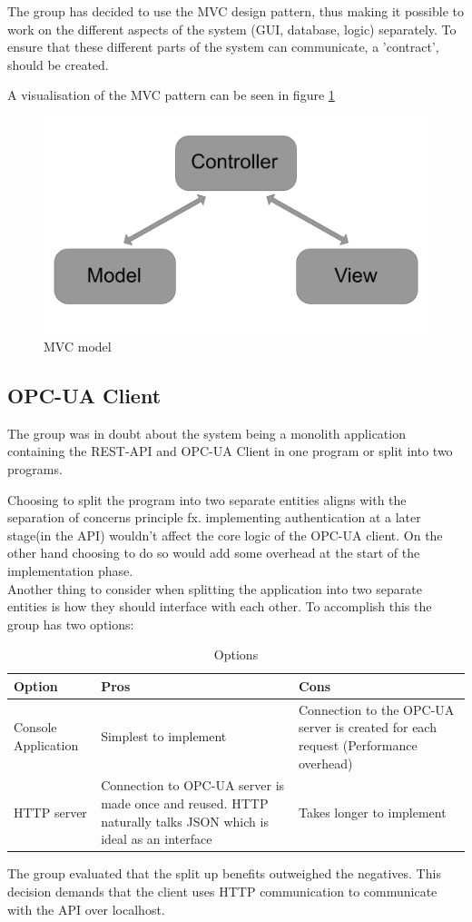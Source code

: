 The group has decided to use the MVC design pattern, thus making it possible to
work on the different aspects of the system (GUI, database, logic) separately.
To ensure that these different parts of the system can communicate, a
'contract', should be created.

A visualisation of the MVC pattern can be seen in figure \ref{figure:MVC_model}

\begin{figure}[ht]
    \centering
    \includegraphics[scale=0.15]{images/MVC_model.png}
    \caption{MVC model}
    \label{figure:MVC_model}
\end{figure}

\subsection{OPC-UA Client}
The group was in doubt about the system being a monolith application containing 
the REST-API and OPC-UA Client in one program or split into two programs.

Choosing to split the program into two separate entities aligns with the 
separation of concerns principle fx. implementing authentication at a later 
stage(in the API) wouldn't affect the core logic of the OPC-UA client. On the 
other hand choosing to do so would add some overhead at the start of the 
implementation phase. \\

Another thing to consider when splitting the application into two separate 
entities is how they should interface with each other. To accomplish this the 
group has two options: 

\begin{table}[ht]
    \begin{tabularx}{\textwidth}{|>{\RaggedRight}X|>{\RaggedRight}X|>{\RaggedRight}X|}
        \hline
        \textbf{Option} & \textbf{Pros} & \textbf{Cons} \\
        \hline
        Console Application & Simplest to implement & Connection to the OPC-UA 
        server is created for each request (Performance overhead)\\
        \hline
        HTTP server & Connection to OPC-UA server is made once and reused. HTTP
        naturally talks JSON which is ideal as an interface & Takes longer to 
        implement \\
        \hline
    \end{tabularx}
    \caption{Options}
    \label{someLabel}
\end{table}

The group evaluated that the split up benefits outweighed the negatives. This 
decision demands that the client uses HTTP communication to communicate with the
API over localhost. 